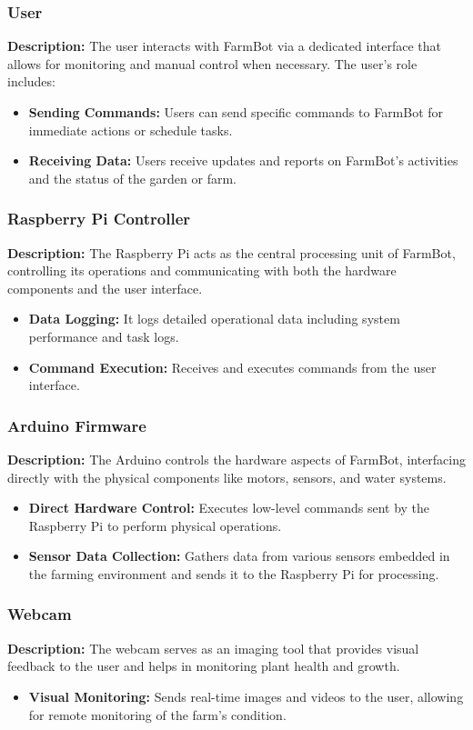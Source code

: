 \subsubsection{User}
\textbf{Description:} The user interacts with FarmBot via a dedicated interface that allows for monitoring and manual control when necessary. The user's role includes:
\begin{itemize}
    \item \textbf{Sending Commands:} Users can send specific commands to FarmBot for immediate actions or schedule tasks.
    \item \textbf{Receiving Data:} Users receive updates and reports on FarmBot's activities and the status of the garden or farm.
\end{itemize}

\subsubsection{Raspberry Pi Controller}
\textbf{Description:} The Raspberry Pi acts as the central processing unit of FarmBot, controlling its operations and communicating with both the hardware components and the user interface.
\begin{itemize}
    \item \textbf{Data Logging:} It logs detailed operational data including system performance and task logs.
    \item \textbf{Command Execution:} Receives and executes commands from the user interface.
\end{itemize}

\subsubsection{Arduino Firmware}
\textbf{Description:} The Arduino controls the hardware aspects of FarmBot, interfacing directly with the physical components like motors, sensors, and water systems.
\begin{itemize}
    \item \textbf{Direct Hardware Control:} Executes low-level commands sent by the Raspberry Pi to perform physical operations.
    \item \textbf{Sensor Data Collection:} Gathers data from various sensors embedded in the farming environment and sends it to the Raspberry Pi for processing.
\end{itemize}

\subsubsection{Webcam}
\textbf{Description:} The webcam serves as an imaging tool that provides visual feedback to the user and helps in monitoring plant health and growth.
\begin{itemize}
    \item \textbf{Visual Monitoring:} Sends real-time images and videos to the user, allowing for remote monitoring of the farm's condition.
\end{itemize}


